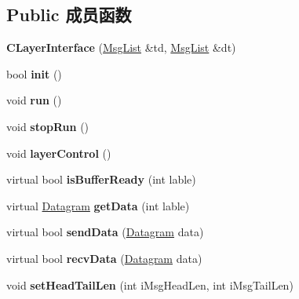 \subsection*{Public 成员函数}
\begin{DoxyCompactItemize}
\item 
\mbox{\label{class_c_layer_interface_a505d26b4942bb87ece39152a71bcfb62}} 
{\bfseries C\+Layer\+Interface} (\hyperlink{class_msg_list}{Msg\+List} \&td, \hyperlink{class_msg_list}{Msg\+List} \&dt)
\item 
\mbox{\label{class_c_layer_interface_a82cdd178439031dd581a8f7208f2a134}} 
bool {\bfseries init} ()
\item 
\mbox{\label{class_c_layer_interface_a72740530fff12b29c8d1fb23aed88f2c}} 
void {\bfseries run} ()
\item 
\mbox{\label{class_c_layer_interface_aa77c283e1d595a23513ff21cbf72ab97}} 
void {\bfseries stop\+Run} ()
\item 
\mbox{\label{class_c_layer_interface_ad2d30dcc6415c22dd01f87114753d996}} 
void {\bfseries layer\+Control} ()
\item 
\mbox{\label{class_c_layer_interface_a4979d7b5740c06be048e4b0f1195c8fc}} 
virtual bool {\bfseries is\+Buffer\+Ready} (int lable)
\item 
\mbox{\label{class_c_layer_interface_a804d604d3e0032e676d02fd5d369607e}} 
virtual \hyperlink{class_datagram}{Datagram} {\bfseries get\+Data} (int lable)
\item 
\mbox{\label{class_c_layer_interface_ae5115cf6ee0e76247dac067cc797a06b}} 
virtual bool {\bfseries send\+Data} (\hyperlink{class_datagram}{Datagram} data)
\item 
\mbox{\label{class_c_layer_interface_a72415f0966b67359e0ee885d98827c3f}} 
virtual bool {\bfseries recv\+Data} (\hyperlink{class_datagram}{Datagram} data)
\item 
\mbox{\label{class_c_layer_interface_a006961acbffa93cc0936010432b8e612}} 
void {\bfseries set\+Head\+Tail\+Len} (int i\+Msg\+Head\+Len, int i\+Msg\+Tail\+Len)
\end{DoxyCompactItemize}
